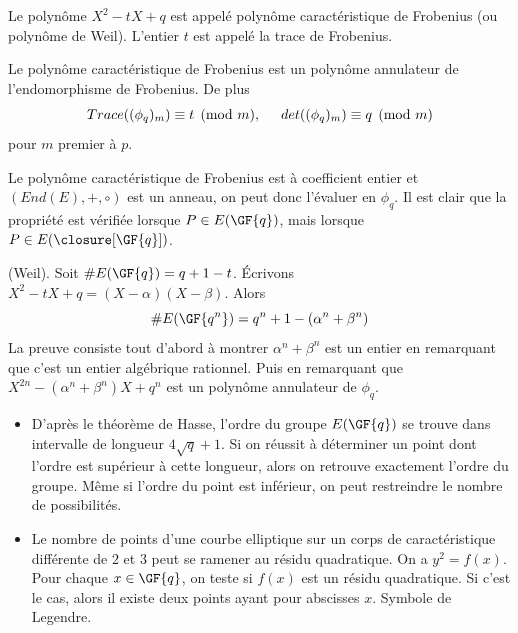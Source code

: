 
\begin{definition}
Le polynôme $X^2 - tX + q$ est appelé polynôme caractéristique de Frobenius (ou polynôme de Weil). L'entier $t$ est appelé la trace de Frobenius.
\end{definition}

\begin{theoreme}
Le polynôme caractéristique de Frobenius est un polynôme annulateur de l'endomorphisme de Frobenius. De plus 
$$Trace((\phi_q)_m) \equiv t \pmod m, \hspace{0.5cm} det((\phi_q)_m) \equiv q \pmod m$$
pour $m$ premier à $p$.
\end{theoreme}
Le polynôme caractéristique de Frobenius est à coefficient entier et $(End(E), +, \circ)$ est un anneau, on peut donc l'évaluer en $\phi_q$. Il est clair que la propriété est vérifiée lorsque $P \in E(\GF{q})$, mais lorsque $P \in E(\closure[\GF{q}])$.

\begin{theoreme}(Weil).
Soit $\# E(\GF{q}) = q + 1 - t$. \'Ecrivons $X^2 - tX + q = (X - \alpha)(X - \beta)$. Alors
\begin{equation}
\# E(\GF{q^n}) = q^n + 1 - (\alpha^n + \beta^n)
\end{equation}
La preuve consiste tout d'abord à montrer $\alpha^n + \beta^n$ est un entier en remarquant que c'est un entier algébrique rationnel. Puis en remarquant que $X^{2n} - (\alpha^n + \beta^n)X + q^n$ est un polynôme annulateur de $\phi_q$. 
\end{theoreme} 

\begin{itemize}[label=$\bullet$]
    \item D'après le théorème de Hasse, l'ordre du groupe $E(\GF{q})$ se trouve dans intervalle de longueur $4\sqrt{q} + 1$. Si on réussit à déterminer un point dont l'ordre est supérieur à cette longueur, alors on retrouve exactement l'ordre du groupe. Même si l'ordre du point est inférieur, on peut restreindre le nombre de possibilités.
    \item Le nombre de points d'une courbe elliptique sur un corps de caractéristique différente de $2$ et $3$ peut se ramener au résidu quadratique. On a $y^2 = f(x)$. Pour chaque $x \in \GF{q}$, on teste si $f(x)$ est un résidu quadratique. Si c'est le cas, alors il existe deux points ayant pour abscisses $x$. Symbole de Legendre.
\end{itemize}

